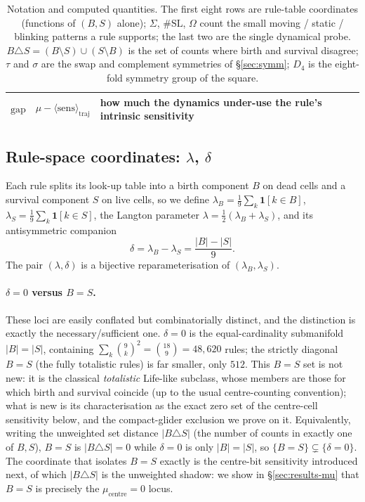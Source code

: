 \documentclass{article}
\begin{document}
\begin{table}[h]
\begin{tabular}{llp{6.2cm}}
$\mathrm{gap}$ & $\mu-\langle\mathrm{sens}\rangle_{\text{traj}}$ & how much the dynamics under-use the rule's intrinsic sensitivity \\
\bottomrule
\end{tabular}
\caption{Notation and computed quantities. The first eight rows are rule-table
coordinates (functions of $(B,S)$ alone); $\Sigma$, $\#\mathrm{SL}$, $\Omega$ count
the small moving / static / blinking patterns a rule supports; the last two are
the single dynamical probe. $B\triangle S=(B\setminus S)\cup(S\setminus B)$ is the
set of counts where birth and survival disagree; $\tau$ and $\sigma$ are the swap
and complement symmetries of \S\ref{sec:symm}; $D_4$ is the eight-fold symmetry
group of the square.}
\label{tab:notation}
\end{table}

\subsection{Rule-space coordinates: $\lambda$, $\delta$}
\label{sec:coords}

Each rule splits its look-up table into a birth component $B$ on dead cells and a
survival component $S$ on live cells, so we define $\lambda_B=\tfrac19\sum_k\mathbf
1[k\in B]$, $\lambda_S=\tfrac19\sum_k\mathbf 1[k\in S]$, the Langton parameter
$\lambda=\tfrac12(\lambda_B+\lambda_S)$, and its antisymmetric companion
\begin{equation}
  \delta=\lambda_B-\lambda_S=\frac{|B|-|S|}{9}.
\end{equation}
The pair $(\lambda,\delta)$ is a bijective reparameterisation of
$(\lambda_B,\lambda_S)$.

\paragraph{$\delta=0$ versus $B=S$.}
These loci are easily conflated but combinatorially distinct, and the distinction
is exactly the necessary/sufficient one. $\delta=0$ is the equal-cardinality
submanifold $|B|=|S|$, containing $\sum_k\binom{9}{k}^2=\binom{18}{9}=48{,}620$
rules; the strictly diagonal $B=S$ (the fully totalistic rules) is far smaller,
only $512$. This $B=S$ set is not new: it is the classical \emph{totalistic}
Life-like subclass, whose members are those for which birth and survival coincide
(up to the usual centre-counting convention); what is new is its characterisation
as the exact zero set of the centre-cell sensitivity below, and the compact-glider
exclusion we prove on it. Equivalently, writing the unweighted set distance $|B\triangle S|$
(the number of counts in exactly one of $B,S$), $B=S$ is $|B\triangle S|=0$ while
$\delta=0$ is only $|B|=|S|$, so $\{B=S\}\subsetneq\{\delta=0\}$. The coordinate
that isolates $B=S$ exactly is the centre-bit sensitivity introduced next, of
which $|B\triangle S|$ is the unweighted shadow: we show in \S\ref{sec:results-mu}
that $B=S$ is precisely the $\mu_{\text{centre}}=0$ locus.
\end{document}
